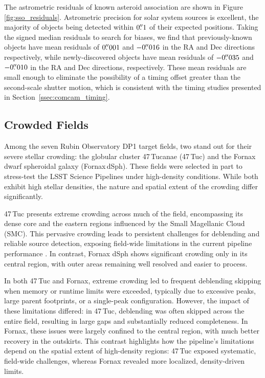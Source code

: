 The astrometric residuals of known asteroid association are shown in Figure \ref{fig:sso_residuals}.
Astrometric precision for solar system sources is excellent, the majority of objects being detected within $0\mbox{$.\!\!^{\prime\prime}$}1$ of their expected positions.
Taking the signed median residuals to search for biases, we find that previously-known objects have mean residuals of $0\mbox{$.\!\!^{\prime\prime}$}001$ and $-0\mbox{$.\!\!^{\prime\prime}$}016$ in the RA and Dec directions respectively, while newly-discovered objects have mean residuals of $-0\mbox{$.\!\!^{\prime\prime}$}035$ and $-0\mbox{$.\!\!^{\prime\prime}$}010$ in the \gls{RA} and Dec directions, respectively.
These mean residuals are small enough to eliminate the possibility of a timing offset greater than the second-scale shutter motion, which is consistent with the timing studies presented in Section~\ref{ssec:comcam_timing}.

\subsection{Crowded Fields}
Among the seven Rubin Observatory \gls{DP1} target fields, two stand out for their severe stellar crowding: the globular cluster 47\,Tucanae (47\,Tuc) and the Fornax dwarf spheroidal galaxy (Fornax dSph). 
These fields were selected in part to stress-test the LSST Science Pipelines under high-density conditions. 
While both exhibit high stellar densities, the nature and spatial extent of the crowding differ significantly.

47\,Tuc presents extreme crowding across much of the field, encompassing its dense core and the eastern regions influenced by the Small Magellanic Cloud (SMC). 
This pervasive crowding leads to persistent challenges for deblending and reliable source detection, exposing field-wide limitations in the current pipeline performance \citep{Choi2025}. 
In contrast, Fornax \,dSph shows significant crowding only in its central region, with outer areas remaining well resolved and easier to process.

In both 47\,Tuc and Fornax, extreme crowding led to frequent deblending skipping when memory or runtime limits were exceeded, typically due to excessive peaks, large parent footprints, or a single-peak configuration. 
However, the impact of these limitations differed: in 47\,Tuc, deblending was often skipped across the entire field, resulting in large gaps and substantially reduced completeness. 
In Fornax, these issues were largely confined to the central region, with much better recovery in the outskirts. 
This contrast highlights how the pipeline’s limitations depend on the spatial extent of high-density regions: 47\,Tuc exposed systematic, field-wide challenges, whereas Fornax revealed more localized, density-driven limits.

